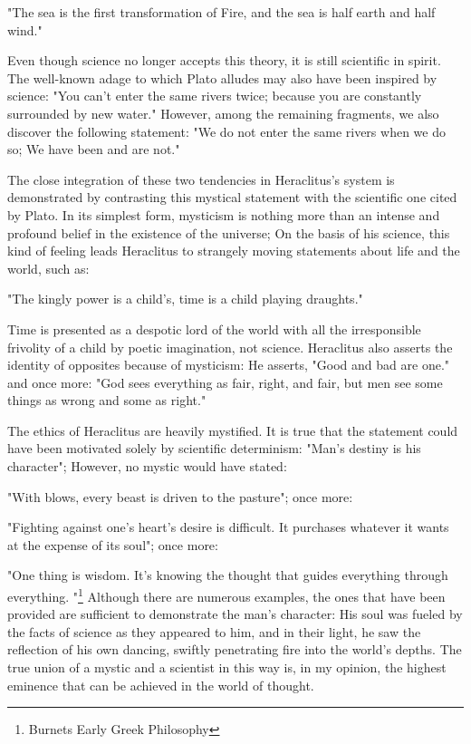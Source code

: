 \documentclass[a4paper,12pt]{book}[2004/02/16]
\theoremstyle{ilemma}
\theoremstyle{itheorem}
\theoremstyle{iother}
\theoremstyle{icorollary}
\theoremstyle{numcorollary}
\theoremstyle{idefinition}
\begin{document}
"The sea is the first transformation of Fire, and the sea is half earth and half wind."

Even though science no longer accepts this theory, it is still scientific in spirit. The well-known adage to which Plato alludes may also have been inspired by science: "You can't enter the same rivers twice; because you are constantly surrounded by new water." However, among the remaining fragments, we also discover the following statement: "We do not enter the same rivers when we do so; We have been and are not."

The close integration of these two tendencies in Heraclitus's system is demonstrated by contrasting this mystical statement with the scientific one cited by Plato. In its simplest form, mysticism is nothing more than an intense and profound belief in the existence of the universe; On the basis of his science, this kind of feeling leads Heraclitus to strangely moving statements about life and the world, such as:

"The kingly power is a child's, time is a child playing draughts."

Time is presented as a despotic lord of the world with all the irresponsible frivolity of a child by poetic imagination, not science. Heraclitus also asserts the identity of opposites because of mysticism: He asserts, "Good and bad are one." and once more: "God sees everything as fair, right, and fair, but men see some things as wrong and some as right."

The ethics of Heraclitus are heavily mystified. It is true that the statement could have been motivated solely by scientific determinism:
"Man's destiny is his character"; However, no mystic would have stated:

"With blows, every beast is driven to the pasture"; once more:

"Fighting against one's heart's desire is difficult. It purchases whatever it wants at the expense of its soul"; once more:

"One thing is wisdom. It's knowing the thought that guides everything through everything. "\footnote{Burnets Early Greek Philosophy} Although there are numerous examples, the ones that have been provided are sufficient to demonstrate the man's character: His soul was fueled by the facts of science as they appeared to him, and in their light, he saw the reflection of his own dancing, swiftly penetrating fire into the world's depths. The true union of a mystic and a scientist in this way is, in my opinion, the highest eminence that can be achieved in the world of thought.
\end{document}
